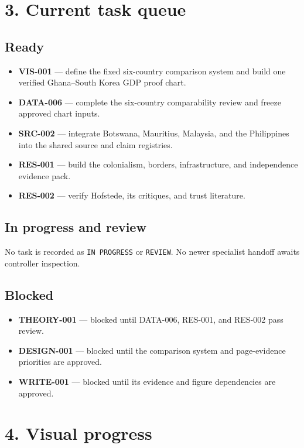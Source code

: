 \documentclass[10pt,a4paper]{article}
\begin{document}
\section{3. Current task queue}

\subsection{Ready}

\begin{itemize}
  \item \textbf{VIS-001} --- define the fixed six-country comparison system and build one verified Ghana--South Korea GDP proof chart.
  \item \textbf{DATA-006} --- complete the six-country comparability review and freeze approved chart inputs.
  \item \textbf{SRC-002} --- integrate Botswana, Mauritius, Malaysia, and the Philippines into the shared source and claim registries.
  \item \textbf{RES-001} --- build the colonialism, borders, infrastructure, and independence evidence pack.
  \item \textbf{RES-002} --- verify Hofstede, its critiques, and trust literature.
\end{itemize}

\subsection{In progress and review}

No task is recorded as \texttt{IN PROGRESS} or \texttt{REVIEW}. No newer specialist handoff awaits controller inspection.

\subsection{Blocked}

\begin{itemize}
  \item \textbf{THEORY-001} --- blocked until DATA-006, RES-001, and RES-002 pass review.
  \item \textbf{DESIGN-001} --- blocked until the comparison system and page-evidence priorities are approved.
  \item \textbf{WRITE-001} --- blocked until its evidence and figure dependencies are approved.
\end{itemize}

\section{4. Visual progress}
\end{document}

